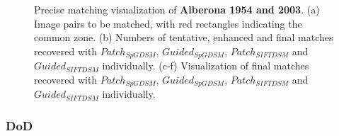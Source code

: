 \begin{figure}[htbp]
\begin{center}
{\begin{minipage}[t]{0.48\linewidth}
			\end{minipage}%
		}
		\caption{Precise matching visualization of \textbf{Alberona 1954 and 2003}. (a) Image pairs to be matched, with red rectangles indicating the common zone. (b) Numbers of tentative, enhanced and final matches recovered with $Patch_{SpGDSM}$, $Guided_{SpGDSM}$, $Patch_{SIFTDSM}$ and $Guided_{SIFTDSM}$ individually. (c-f) Visualization of final matches recovered with $Patch_{SpGDSM}$, $Guided_{SpGDSM}$, $Patch_{SIFTDSM}$ and $Guided_{SIFTDSM}$ individually.}
		\label{MatchVizAlberona}
	\end{center}
\end{figure} 


\subsubsection{DoD}

